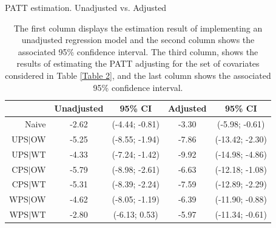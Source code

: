 \documentclass[oupdraft]{bio}
\begin{document}
\begin{table}[ht]
\centering %
\caption{PATT estimation. Unadjusted vs. Adjusted}{\textit{\small{}} \label{Table 3}}
\begin{tabular}{r |cc|cc}
\hline 
 & Unadjusted  & 95\% CI  & Adjusted  & 95\% CI \tabularnewline
\hline 
     Naive & -2.62 & (-4.44; -0.81) & -3.30 & (-5.98; -0.61) \\ 
  UPS$|$OW & -5.25 & (-8.55; -1.94) & -7.86 & (-13.42; -2.30) \\ 
  UPS$|$WT & -4.33 & (-7.24; -1.42) & -9.92 & (-14.98; -4.86) \\ 
  CPS$|$OW & -5.79 & (-8.98; -2.61) & -6.63 & (-12.18; -1.08) \\ 
  CPS$|$WT & -5.31 & (-8.39; -2.24) & -7.59 & (-12.89; -2.29) \\ 
  WPS$|$OW & -4.62 & (-8.05; -1.19) & -6.39 & (-11.90; -0.88) \\ 
  WPS$|$WT & -2.80 & (-6.13; 0.53)  & -5.97 & (-11.34; -0.61) \\
\hline 
\end{tabular}

\caption*{The first column displays the estimation result of implementing an unadjusted regression model and the second column shows the associated 95\% confidence interval. The third column, shows the results of estimating the PATT adjusting for the set of covariates considered in Table \ref{Table 2}, and the last column shows the associated 95\% confidence interval.}
\end{table}
\end{document}
